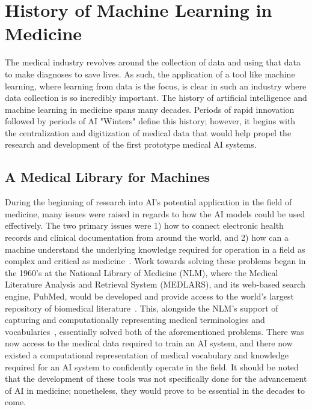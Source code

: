 \documentclass{article}
\begin{document}
\section{History of Machine Learning in Medicine}

The medical industry revolves around the collection of data and using that data to make diagnoses to save lives. As such, the application of a tool like machine learning, where learning from data is the focus, is clear in such an industry where data collection is so incredibly important. The history of artificial intelligence and machine learning in medicine spans many decades. Periods of rapid innovation followed by periods of AI "Winters" define this history; however, it begins with the centralization and digitization of medical data that would help propel the research and development of the first prototype medical AI systems.

\subsection{A Medical Library for Machines}

During the beginning of research into AI's potential application in the field of medicine, many issues were raised in regards to how the AI models could be used effectively. The two primary issues were 1) how to connect electronic health records and clinical documentation from around the world, and 2) how can a machine understand the underlying knowledge required for operation in a field as complex and critical as medicine~\cite{kulikowski_beginnings_2019}. Work towards solving these problems began in the 1960's at the National Library of Medicine (NLM), where the Medical Literature Analysis and Retrieval System (MEDLARS), and its web-based search engine, PubMed, would be developed and provide access to the world's largest repository of biomedical literature~\cite{kulikowski_beginnings_2019}. This, alongside the NLM's support of capturing and computationally representing medical terminologies and vocabularies~\cite{kulikowski_beginnings_2019}, essentially solved both of the aforementioned problems. There was now access to the medical data required to train an AI system, and there now existed a computational representation of medical vocabulary and knowledge required for an AI system to confidently operate in the field. It should be noted that the development of these tools was not specifically done for the advancement of AI in medicine; nonetheless, they would prove to be essential in the decades to come.
\end{document}
